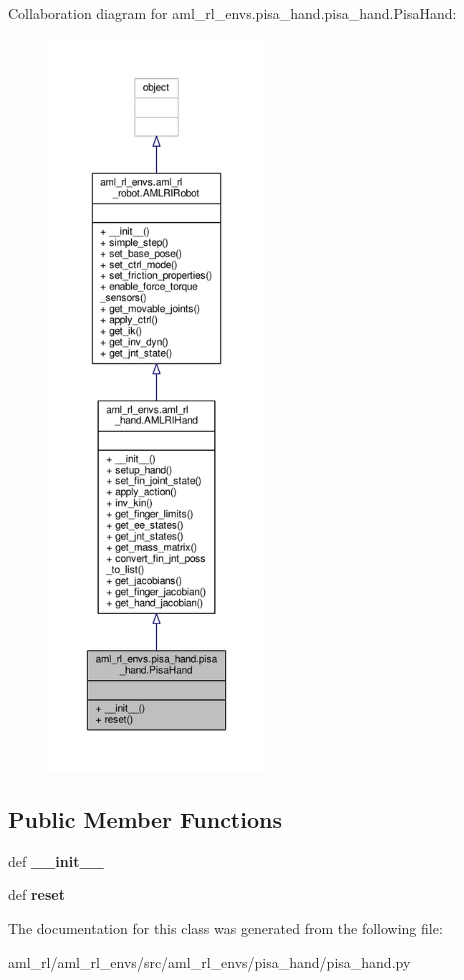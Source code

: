 Collaboration diagram for aml\-\_\-rl\-\_\-envs.\-pisa\-\_\-hand.\-pisa\-\_\-hand.\-Pisa\-Hand\-:
\nopagebreak
\begin{figure}[H]
\begin{center}
\leavevmode
\includegraphics[height=550pt]{classaml__rl__envs_1_1pisa__hand_1_1pisa__hand_1_1_pisa_hand__coll__graph}
\end{center}
\end{figure}
\subsection*{Public Member Functions}
\begin{DoxyCompactItemize}
\item 
\hypertarget{classaml__rl__envs_1_1pisa__hand_1_1pisa__hand_1_1_pisa_hand_a0e2a66809eb28e0b8106ef1f7b736ff0}{def {\bfseries \-\_\-\-\_\-init\-\_\-\-\_\-}}\label{classaml__rl__envs_1_1pisa__hand_1_1pisa__hand_1_1_pisa_hand_a0e2a66809eb28e0b8106ef1f7b736ff0}

\item 
\hypertarget{classaml__rl__envs_1_1pisa__hand_1_1pisa__hand_1_1_pisa_hand_a40352376e6877e869540fd90dee7ed2f}{def {\bfseries reset}}\label{classaml__rl__envs_1_1pisa__hand_1_1pisa__hand_1_1_pisa_hand_a40352376e6877e869540fd90dee7ed2f}

\end{DoxyCompactItemize}


The documentation for this class was generated from the following file\-:\begin{DoxyCompactItemize}
\item 
aml\-\_\-rl/aml\-\_\-rl\-\_\-envs/src/aml\-\_\-rl\-\_\-envs/pisa\-\_\-hand/pisa\-\_\-hand.\-py\end{DoxyCompactItemize}
